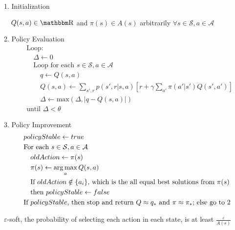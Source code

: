 \documentclass[sutton_barto_notes.tex]{subfiles}
\begin{document}
\begin{tcolorbox}[width=\textwidth,title={Policy Iteration (using iterative policy evaluation) for estimating $\pi \approx \pi_*$}]
1. Initialization

$\quad Q(s,a) \in\R$ and $\pi(s) \in A(s)$ arbitrarily $\forall s \in \mathcal{S}, a \in \mathcal{A}$

2. Policy Evaluation
\begin{align*}
&\text{Loop:}\\
&\quad\Delta \leftarrow 0\\
&\quad\text{Loop for each } s \in \mathcal{S}, a \in \mathcal{A}\\
&\quad\quad q \leftarrow Q(s,a)\\
&\quad\quad Q(s,a) \leftarrow \sum_{s',r} p(s',r|s,a)[r + \gamma \sum_{a'}\pi(a'|s')Q(s',a')]\\
&\quad\quad \Delta \leftarrow \text{max}(\Delta, |q-Q(s,a)|)\\
&\text{until } \Delta < \theta
\end{align*}

3. Policy Improvement
\begin{align*}
&policyStable \leftarrow true\\
&\text{For each } s \in \mathcal{S}, a \in \mathcal{A}\\
&\quad oldAction \leftarrow \pi(s)\\
&\quad \pi(s) \leftarrow \operatorname*{arg\,max}_a Q(s,a)\\
&\quad \text{If } oldAction \notin \{a_i\} \text{, which is the all equal best solutions from $\pi(s)$}\\
& \quad \text{then } policyStable \leftarrow false\\
&\text{If } policyStable \text{, then stop and return } Q \approx q_* \text{ and } \pi \approx \pi_*\text{; else go to 2}	
\end{align*}
\end{tcolorbox}


\begin{definition}
$\varepsilon$-soft, the probability of selecting each action in each state, is at least $\frac{\varepsilon}{A(s)}$
\end{definition}
\end{document}
